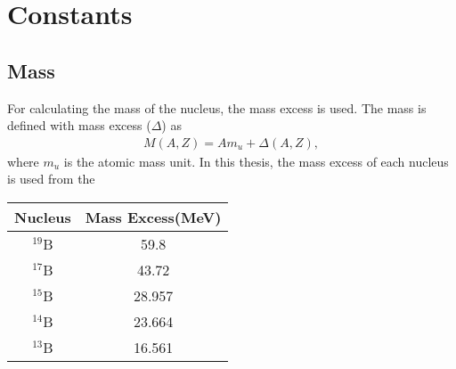 \appendix

\chapter{Constants}
\section{Mass}
For calculating the mass of the nucleus, the mass excess is used. The mass is defined with mass excess ($\Delta$) as
\begin{align}
    M(A,Z) = A m_u + \Delta(A,Z),
\end{align}
where $m_u$ is the atomic mass unit. In this thesis, the mass excess of each nucleus is used from the ~~
\begin{table}[h]
    \centering
    \begin{tabular}{c|c}
        \hline
        Nucleus & Mass Excess(MeV) \\
        \hline
        ${}^{19}$B & 59.8 \\
        ${}^{17}$B & 43.72 \\
        ${}^{15}$B & 28.957 \\
        ${}^{14}$B & 23.664 \\
        ${}^{13}$B & 16.561 \\
        \hline
    \end{tabular}
\end{table}

\section{}
